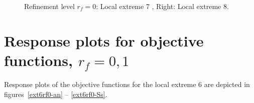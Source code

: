 \documentclass[review,times,3p,twocolumn,10pt]{elsarticle}
\begin{document}
\begin{figure}[htb!]
\label{rf0ex4}
\caption{Refinement level $r_f=0$: Local extreme 7 , Right: Local extreme 8.}
\end{figure}


\section{Response plots for objective functions, $r_f=0,1$}
 
 Response plots of the objective functions for the local extreme 6 are depicted in figures~\ref{ext6rf0-an} -- \ref{ext6rf0-Ss}.
 
\end{document}
